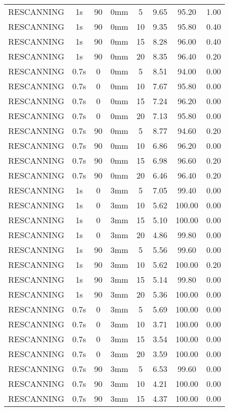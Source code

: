 \begin{table}[H]
\begin{tabular}{|c||c|c|c|c||c|c|c|}
RESCANNING & 1s & 90 & 0mm & 5 & 9.65 & 95.20 & 1.00 \\
RESCANNING & 1s & 90 & 0mm & 10 & 9.35 & 95.80 & 0.40 \\
RESCANNING & 1s & 90 & 0mm & 15 & 8.28 & 96.00 & 0.40 \\
RESCANNING & 1s & 90 & 0mm & 20 & 8.35 & 96.40 & 0.20 \\
RESCANNING & 0.7s & 0 & 0mm & 5 & 8.51 & 94.00 & 0.00 \\
RESCANNING & 0.7s & 0 & 0mm & 10 & 7.67 & 95.80 & 0.00 \\
RESCANNING & 0.7s & 0 & 0mm & 15 & 7.24 & 96.20 & 0.00 \\
RESCANNING & 0.7s & 0 & 0mm & 20 & 7.13 & 95.80 & 0.00 \\
RESCANNING & 0.7s & 90 & 0mm & 5 & 8.77 & 94.60 & 0.20 \\
RESCANNING & 0.7s & 90 & 0mm & 10 & 6.86 & 96.20 & 0.00 \\
RESCANNING & 0.7s & 90 & 0mm & 15 & 6.98 & 96.60 & 0.20 \\
RESCANNING & 0.7s & 90 & 0mm & 20 & 6.46 & 96.40 & 0.20 \\
RESCANNING & 1s & 0 & 3mm & 5 & 7.05 & 99.40 & 0.00 \\
RESCANNING & 1s & 0 & 3mm & 10 & 5.62 & 100.00 & 0.00 \\
RESCANNING & 1s & 0 & 3mm & 15 & 5.10 & 100.00 & 0.00 \\
RESCANNING & 1s & 0 & 3mm & 20 & 4.86 & 99.80 & 0.00 \\
RESCANNING & 1s & 90 & 3mm & 5 & 5.56 & 99.60 & 0.00 \\
RESCANNING & 1s & 90 & 3mm & 10 & 5.62 & 100.00 & 0.20 \\
RESCANNING & 1s & 90 & 3mm & 15 & 5.14 & 99.80 & 0.00 \\
RESCANNING & 1s & 90 & 3mm & 20 & 5.36 & 100.00 & 0.00 \\
RESCANNING & 0.7s & 0 & 3mm & 5 & 5.69 & 100.00 & 0.00 \\
RESCANNING & 0.7s & 0 & 3mm & 10 & 3.71 & 100.00 & 0.00 \\
RESCANNING & 0.7s & 0 & 3mm & 15 & 3.54 & 100.00 & 0.00 \\
RESCANNING & 0.7s & 0 & 3mm & 20 & 3.59 & 100.00 & 0.00 \\
RESCANNING & 0.7s & 90 & 3mm & 5 & 6.53 & 99.60 & 0.00 \\
RESCANNING & 0.7s & 90 & 3mm & 10 & 4.21 & 100.00 & 0.00 \\
RESCANNING & 0.7s & 90 & 3mm & 15 & 4.37 & 100.00 & 0.00 \\

\end{tabular}
\end{table}
